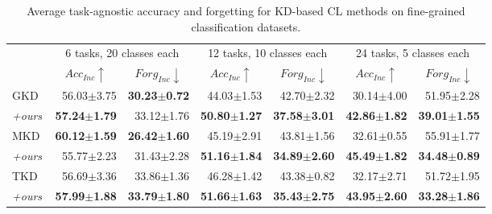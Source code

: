 \documentclass[10pt,twocolumn,letterpaper]{article}
\newcommand\rev[1]{{#1}}
\newcommand\gkd{GKD}
\newcommand\tkd{TKD}
\newcommand\ta{TA}
\newcommand\wu{WU}
\begin{document}
\begin{table*}[!th]
\small
\centering

\begin{tabular}{@{}lrrrrrr@{}}
\toprule
 &
  \multicolumn{2}{c}{6 tasks, 20 classes each} &
  \multicolumn{2}{c}{12 tasks, 10 classes each} &
  \multicolumn{2}{c}{24 tasks, 5 classes each} \\ \cmidrule{2-7}
 &
  \multicolumn{1}{c}{$Acc_{Inc} \uparrow$} &
  \multicolumn{1}{c}{$Forg_{Inc} \downarrow$}  &
  \multicolumn{1}{c}{$Acc_{Inc} \uparrow$} &
  \multicolumn{1}{c}{$Forg_{Inc} \downarrow$} &
  \multicolumn{1}{c}{$Acc_{Inc} \uparrow$} &
  \multicolumn{1}{c}{$Forg_{Inc} \downarrow$} \\ \midrule
\gkd\  &
  56.03$\pm$3.75 &
  \textbf{30.23$\pm$0.72} &
  44.03$\pm$1.53 &
  42.70$\pm$2.32 &
  30.14$\pm$4.00 &
  51.95$\pm$2.28 \\
\textit{+ours} &
  \textbf{57.24$\pm$1.79} &
  33.12$\pm$1.76 &
  \textbf{50.80$\pm$1.27} &
  \textbf{37.58$\pm$3.01} &
  \textbf{42.86$\pm$1.82} &
  \textbf{39.01$\pm$1.55} \\
  \midrule
MKD &
  \textbf{60.12$\pm$1.59} &
  \textbf{26.42$\pm$1.60} &
  45.19$\pm$2.91 &
  43.81$\pm$1.56 &
  32.61$\pm$0.55 &
  55.91$\pm$1.77 \\
\textit{+ours} &
  55.77$\pm$2.23 &
  31.43$\pm$2.28 &
  \textbf{51.16$\pm$1.84} &
  \textbf{34.89$\pm$2.60} &
  \textbf{45.49$\pm$1.82} &
  \textbf{34.48$\pm$0.89} \\
  \midrule
\tkd\  &
  56.69$\pm$3.36 &
  33.86$\pm$1.36 &
  46.28$\pm$1.42 &
  43.38$\pm$0.82 &
  32.17$\pm$2.71 &
  51.72$\pm$1.95 \\
\textit{+ours} &
  \textbf{57.99$\pm$1.88} &
  \textbf{33.79$\pm$1.80} &
  \textbf{51.66$\pm$1.63} &
  \textbf{35.43$\pm$2.75} &
  \textbf{43.95$\pm$2.60} &
  \textbf{33.28$\pm$1.86}
\\
\bottomrule
\end{tabular}%
\caption{\rev{Average task-agnostic accuracy and forgetting for KD-based CL methods on fine-grained classification datasets.}}
\label{tab:finegrained_main}
\end{table*}
\end{document}
